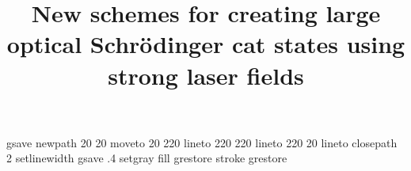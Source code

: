 %
%
%
%
%
\begin{filecontents*}{}
gsave
newpath
  20 20 moveto
  20 220 lineto
  220 220 lineto
  220 20 lineto
closepath
2 setlinewidth
gsave
  .4 setgray fill
grestore
stroke
grestore
\end{filecontents*}
%
\RequirePackage{fix-cm}
%
\documentclass[twocolumn]{svjour3}          %
%
\smartqed  %
%
\usepackage{graphicx}
\usepackage{physics}
\usepackage{cite}
\usepackage{xcolor}
\usepackage{enumerate}
\usepackage{bbm}
\usepackage{MnSymbol}
\usepackage{appendix}
\usepackage{setspace}
\allowdisplaybreaks

\usepackage[
  bookmarks=true,
  colorlinks,
  linkcolor=black,
  urlcolor=black,
  citecolor=black,
  plainpages=false,
  pdfpagelabels,
  final,
  breaklinks=true
]{hyperref}
%
%
%
%
%
\sloppy
\title{New schemes for creating large optical Schrödinger cat states using
strong laser fields
}

